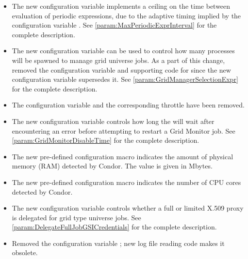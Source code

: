 \begin{itemize}
\item The new configuration variable 
  implements a ceiling on the time between evaluation of periodic expressions,
  due to the adaptive timing implied by the configuration variable
  .
  See \ref{param:MaxPeriodicExprInterval} for the complete description.

\item The new configuration variable 
can be used to control how many  processes will be
spawned to manage grid universe jobs. As a part of this change, removed
the configuration variable and supporting code for 
 since the new configuration variable
supersedes it.
See \ref{param:GridManagerSelectionExpr} for the complete description.

\item The configuration variable
 and the
corresponding throttle 
have been removed.

\item The new configuration variable 
controls how long the  will wait after encountering
an error before attempting to restart a Grid Monitor job.
See \ref{param:GridMonitorDisableTime} for the complete description.

\item The new pre-defined configuration macro 
indicates the amount of physical memory (RAM) detected by Condor.
The value is given in Mbytes.

\item The new pre-defined configuration macro 
indicates the number of CPU cores detected by Condor.

\item The new configuration variable
controls whether a full or limited X.509 proxy is delegated for grid type
  universe jobs.
See \ref{param:DelegateFullJobGSICredentials}
for the complete description.

\item Removed the configuration variable
; new log file reading code makes it
obsolete.


\end{itemize}
